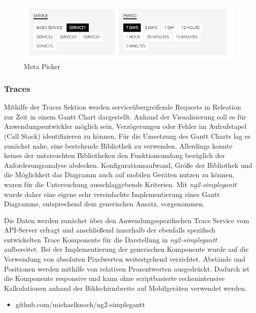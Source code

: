 


\begin{figure}[hptb]
 \centering
 \includegraphics[width=0.8\linewidth]{kapitel4/metapicker.jpg}
 \caption{Meta Picker}
 \label{metapicker}
\end{figure}
\vspace{0.3cm}


\subsubsection{Traces}

Mithilfe der Traces Sektion werden serviceübergreifende Requests in Releation zur Zeit in einem Gantt Chart dargestellt.
Anhand der Visualisierung soll es für Anwendungsentwickler möglich sein, Verzögerungen oder Fehler im Aufrufstapel (Call Stack) identifizieren zu können.
Für die Umsetzung des Gantt Charts lag es zunächst nahe, eine bestehende Bibliothek zu verwenden.
Allerdings konnte keines der untersuchten Bibliotheken den Funktionsumfang bezüglich der Anforderungsanalyse abdecken.
Konfigurationsaufwand, Größe der Bibliothek und die Möglichkeit das Diagramm auch auf mobilen Geräten nutzen zu können, waren für die Untersuchung ausschlaggebende Kriterien.
Mit \emph{ng2-simplegantt} wurde daher eine eigene sehr vereinfachte Implementierung eines Gantt Diagramms, entsprechend dem generischen Ansatz, vorgenommen.

Die Daten werden zunächst über den Anwendungsspezifischen Trace Service vom API-Server erfragt und anschließend innerhalb der ebenfalls spezifisch entwickelten Trace Komponente
für die Darstellung in \emph{ng2-simplegantt} aufbereitet.
Bei der Implementierung der generischen Komponente wurde auf die Verwendung von absoluten Pixelwerten weitestgehend verzichtet.
Abstände und Positionen werden mithilfe von relativen Prozentwerten ausgedrückt. Dadurch ist die Komponente responsive und kann
ohne scriptbasierte rechenintensive Kalkulationen anhand der Bildschirmbreite auf Mobilgeräten verwendet werden.

\begin{itemize}
  \item{github.com/michaelknoch/ng2-simplegantt}
\end{itemize}

